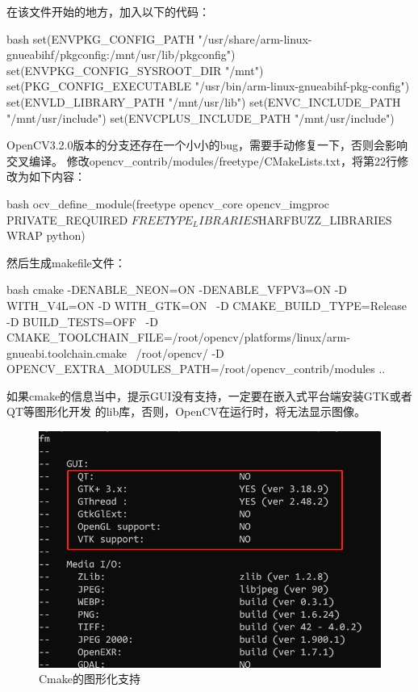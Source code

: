 \begin{outline}[enumerate]
在该文件开始的地方，加入以下的代码：
\begin{code-in-enumerate}{bash}
set(ENV{PKG_CONFIG_PATH} "/usr/share/arm-linux-gnueabihf/pkgconfig:/mnt/usr/lib/pkgconfig")
set(ENV{PKG_CONFIG_SYSROOT_DIR} "/mnt")
set(PKG_CONFIG_EXECUTABLE "/usr/bin/arm-linux-gnueabihf-pkg-config")
set(ENV{LD_LIBRARY_PATH} "/mnt/usr/lib")
set(ENV{C_INCLUDE_PATH} "/mnt/usr/include")
set(ENV{CPLUS_INCLUDE_PATH} "/mnt/usr/include")
\end{code-in-enumerate}

OpenCV3.2.0版本的分支还存在一个小小的bug，需要手动修复一下，否则会影响交叉编译。
修改opencv\_contrib/modules/freetype/CMakeLists.txt，将第22行修改为如下内容：
\begin{code-in-enumerate}{bash}
ocv_define_module(freetype opencv_core opencv_imgproc PRIVATE_REQUIRED ${FREETYPE_LIBRARIES} ${HARFBUZZ_LIBRARIES} WRAP python)
\end{code-in-enumerate}

然后生成makefile文件：
\begin{code-in-enumerate}{bash}
cmake -DENABLE_NEON=ON -DENABLE_VFPV3=ON  -D WITH_V4L=ON  -D WITH_GTK=ON \
    -D CMAKE_BUILD_TYPE=Release -D BUILD_TESTS=OFF \
    -D CMAKE_TOOLCHAIN_FILE=/root/opencv/platforms/linux/arm-gnueabi.toolchain.cmake \
    /root/opencv/ -D OPENCV_EXTRA_MODULES_PATH=/root/opencv_contrib/modules ..
\end{code-in-enumerate}

如果cmake的信息当中，提示GUI没有支持，一定要在嵌入式平台端安装GTK或者QT等图形化开发
的lib库，否则，OpenCV在运行时，将无法显示图像。
\begin{figure}[H]
  \centering
  \includegraphics[scale=0.3]{cross_gui.png}
  \caption{Cmake的图形化支持}
  \label{fig:cross_gui}
\end{figure}


\end{outline}
